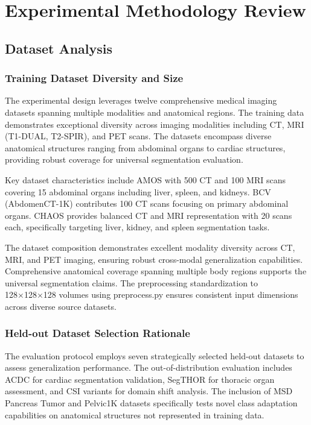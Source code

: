 \section{Experimental Methodology Review}
\label{sec:experimental_methodology}

\subsection{Dataset Analysis}
\subsubsection{Training Dataset Diversity and Size}
The experimental design leverages twelve comprehensive medical imaging datasets spanning multiple modalities and anatomical regions. The training data demonstrates exceptional diversity across imaging modalities including CT, MRI (T1-DUAL, T2-SPIR), and PET scans. The datasets encompass diverse anatomical structures ranging from abdominal organs to cardiac structures, providing robust coverage for universal segmentation evaluation.

Key dataset characteristics include AMOS with 500 CT and 100 MRI scans covering 15 abdominal organs including liver, spleen, and kidneys. BCV (AbdomenCT-1K) contributes 100 CT scans focusing on primary abdominal organs. CHAOS provides balanced CT and MRI representation with 20 scans each, specifically targeting liver, kidney, and spleen segmentation tasks.

The dataset composition demonstrates excellent modality diversity across CT, MRI, and PET imaging, ensuring robust cross-modal generalization capabilities. Comprehensive anatomical coverage spanning multiple body regions supports the universal segmentation claims. The preprocessing standardization to 128×128×128 volumes using preprocess.py ensures consistent input dimensions across diverse source datasets.

\subsubsection{Held-out Dataset Selection Rationale}
The evaluation protocol employs seven strategically selected held-out datasets to assess generalization performance. The out-of-distribution evaluation includes ACDC for cardiac segmentation validation, SegTHOR for thoracic organ assessment, and CSI variants for domain shift analysis. The inclusion of MSD Pancreas Tumor and Pelvic1K datasets specifically tests novel class adaptation capabilities on anatomical structures not represented in training data.

